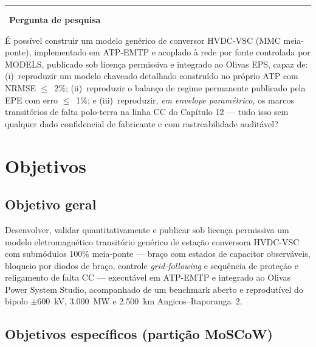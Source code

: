 \documentclass[12pt,a4paper]{article}
\newenvironment{destaque}[1]
  {\par\vspace{6pt}\begin{list}{}{%
     \setlength{\leftmargin}{0.8cm}\setlength{\rightmargin}{0cm}%
     \setlength{\labelwidth}{0pt}\setlength{\labelsep}{0pt}}%
   \item[]\textcolor{acento}{\rule[-1pt]{2pt}{10pt}}\ \textbf{#1}\par\vspace{2pt}\small}
  {\end{list}\vspace{6pt}}
\begin{document}
\begin{destaque}{Pergunta de pesquisa}
É possível construir um modelo genérico de conversor HVDC-VSC (MMC meia-ponte), implementado em
ATP-EMTP e acoplado à rede por fonte controlada por MODELS, publicado sob licença permissiva e
integrado ao Olivas EPS, capaz de: (i)~reproduzir um modelo chaveado detalhado construído no próprio
ATP com NRMSE $\leq$~2\%; (ii)~reproduzir o balanço de regime permanente publicado pela EPE com erro
$\leq$~1\%; e (iii)~reproduzir, \emph{em envelope paramétrico}, os marcos transitórios de falta
polo-terra na linha CC do Capítulo 12 --- tudo isso sem qualquer dado confidencial de fabricante e
com rastreabilidade auditável?
\end{destaque}

\section{Objetivos}

\subsection{Objetivo geral}

Desenvolver, validar quantitativamente e publicar sob licença permissiva um modelo eletromagnético
transitório genérico de estação conversora HVDC-VSC com submódulos 100\% meia-ponte --- braço com
estados de capacitor observáveis, bloqueio por diodos de braço, controle \emph{grid-following} e
sequência de proteção e religamento de falta CC --- executável em ATP-EMTP e integrado ao Olivas
Power System Studio, acompanhado de um benchmark aberto e reprodutível do bipolo $\pm$600~kV,
3.000~MW e 2.500~km Angicos--Itaporanga~2.

\subsection{Objetivos específicos (partição MoSCoW)}
\end{document}

